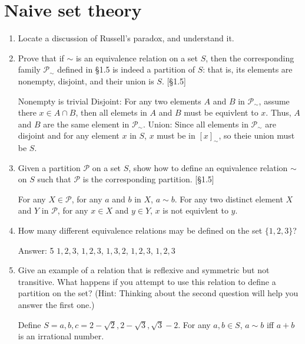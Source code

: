 \section{Naive set theory}
\begin{enumerate}
    \item Locate a discussion of Russell's paradox, and understand it.

    \item Prove that if $\sim$ is an equivalence relation on a set $S$, then the corresponding family $\mathcal{P}_{\sim}$ defined in \S1.5 is indeed a partition of $S$: that is, its elements are nonempty, disjoint, and their union is $S$. [\S1.5]
        \begin{solution}
            Nonempty is trivial
            Disjoint: For any two elements $A$ and $B$ in $\mathcal{P}_{\sim}$, assume there $x\in A\cap B $, then all elemets in $A$ and $B$ must be equivlent to $x$. Thus, $A$ and $B$ are the same element in $\mathcal{P}_{\sim}$. 
            Union: Since all elements in $\mathcal{P}_{\sim}$ are disjoint and for any element $x$ in $S$, $x$ must be in $[x]_{\sim}$, so theie union must be $S$. 
        \end{solution}
    \item Given a partition $\mathcal{P}$ on a set $S$, show how to define an equivalence relation $\sim$ on $S$ such that $\mathcal{P}$ is the corresponding partition. [\S1.5]
        \begin{solution} 
            For any $X \in \mathcal{P}$, for any $a$ and $b$ in $X$, $a\sim b$. 
            For any two distinct element $X$ and $Y$ in $\mathcal{P}$, for any $x\in X$ and $y\in Y$, $x$ is not equivlent to $y$. 
        \end{solution}
    \item How many different equivalence relations may be defined on the set $\{1, 2, 3\}$?
        \begin{solution}
                Answer: 5
                ${{1,2},{3}}$, ${{1}, {2}, {3}}$, ${{1,3},{2}}$, ${{1},{2,3}}$, ${1,2,3}$
        \end{solution}
    \item Give an example of a relation that is reflexive and symmetric but not transitive. What happens if you attempt to use this relation to define a partition on the set? (Hint: Thinking about the second question will help you answer the first one.)
    \begin{solution}
            Define $S={a,b,c}={2-\sqrt{2},2-\sqrt{3},\sqrt{3}-2}$. For any $a,b \in S$, $a\sim b$ iff $a+b$ is an irrational number. 

\end{solution}
\end{enumerate}
